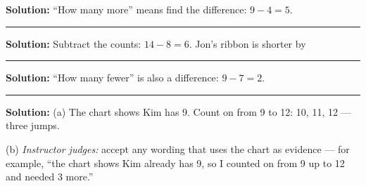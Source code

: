 \documentclass[12pt]{article}
\begin{document}

\textbf{Solution:} ``How many more'' means find the difference: $9 - 4 = 5$.

\vspace{0.2cm}\noindent\rule{\linewidth}{0.2pt}\vspace{0.1cm}


\textbf{Solution:} Subtract the counts: $14 - 8 = 6$. Jon's ribbon is shorter
by 

\vspace{0.2cm}\noindent\rule{\linewidth}{0.2pt}\vspace{0.1cm}


\textbf{Solution:} ``How many fewer'' is also a difference: $9 - 7 = 2$.

\vspace{0.2cm}\noindent\rule{\linewidth}{0.2pt}\vspace{0.1cm}


\textbf{Solution:} (a) The chart shows Kim has 9. Count on from 9 to 12: 10,
11, 12 --- three jumps. 

(b) \emph{Instructor judges:} accept any wording that uses the chart as
evidence --- for example, ``the chart shows Kim already has 9, so I counted
on from 9 up to 12 and needed 3 more.''
\end{document}

